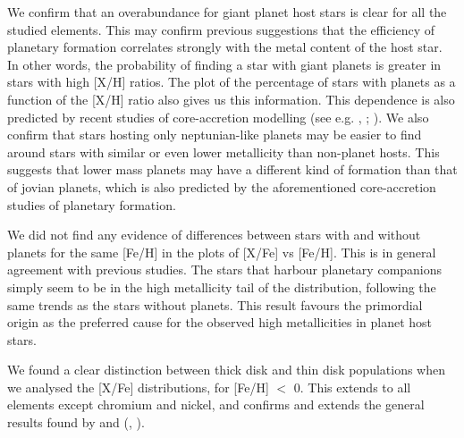 \documentclass[oldversion]{aa}
\begin{document}
We confirm that an overabundance for giant planet host stars is clear for all the studied elements. This may confirm previous suggestions that the efficiency of planetary formation correlates strongly with the metal content of the host star. In other words, the probability of finding a star with giant planets is greater in stars with high [X/H] ratios. The plot of the percentage of stars with planets as a function of the [X/H] ratio also gives us this information. This dependence is also predicted by recent studies of core-accretion modelling (see e.g. \citeauthor{Ida-2004a} \citeyear{Ida-2004b}, \citeyear{Ida-2004b}; \citeauthor{Benz-2006} \citeyear{Benz-2006}).
We also confirm that stars hosting only neptunian-like planets may be easier to find around stars with similar or even lower metallicity than non-planet hosts. This suggests that lower mass planets may have a different kind of formation than that of jovian planets, which is also predicted by the aforementioned core-accretion studies of planetary formation. %

We did not find any evidence of differences between stars with and without planets for the same [Fe/H] in the plots of [X/Fe] vs [Fe/H]. This is in general agreement with previous studies. The stars that harbour planetary companions simply seem to be in the high metallicity tail of the distribution, following the same trends as the stars without planets. This result favours the primordial origin as the preferred cause for the observed high metallicities in planet host stars. %

We found a clear distinction between thick disk and thin disk populations when we analysed the [X/Fe] distributions, for [Fe/H] $<$ 0. This extends to all elements except chromium and nickel, and confirms and extends the general results found by \citet{Fuhrmann-1998} and \citeauthor{Bensby-2003} (\citeyear{Bensby-2003}, \citeyear{Bensby-2005}). %
\end{document}
